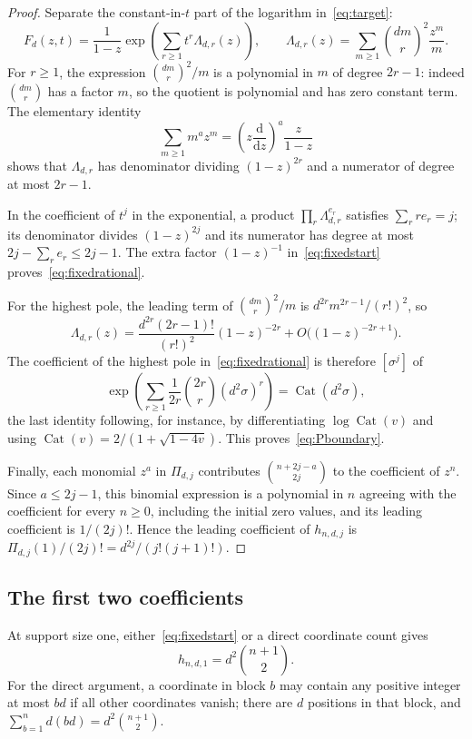 \documentclass[11pt]{article}
\numberwithin{equation}{section}
\theoremstyle{definition}
\newcommand{\Cat}{\operatorname{Cat}}
\begin{document}
\begin{proof}
Separate the constant-in-$t$ part of the logarithm in~\eqref{eq:target}:
\begin{equation}
 F_d(z,t)=\frac1{1-z}
   \exp\left(\sum_{r\geq1}t^r\Lambda_{d,r}(z)\right),
 \qquad
 \Lambda_{d,r}(z)=\sum_{m\geq1}\binom{dm}{r}^{\!2}\frac{z^m}{m}.
 \label{eq:fixedstart}
\end{equation}
For $r\geq1$, the expression $\binom{dm}{r}^2/m$ is a polynomial in $m$ of
degree $2r-1$: indeed $\binom{dm}{r}$ has a factor $m$, so the quotient is
polynomial and has zero constant term. The elementary identity
\[
 \sum_{m\geq1}m^az^m=\left(z\frac{\mathrm d}{\mathrm dz}\right)^a\frac{z}{1-z}
\]
shows that $\Lambda_{d,r}$ has denominator dividing $(1-z)^{2r}$ and a
numerator of degree at most $2r-1$.

In the coefficient of $t^j$ in the exponential, a product
$\prod_r\Lambda_{d,r}^{e_r}$ satisfies $\sum_r re_r=j$; its denominator
divides $(1-z)^{2j}$ and its numerator has degree at most
$2j-\sum_re_r\leq2j-1$. The extra factor $(1-z)^{-1}$
in~\eqref{eq:fixedstart} proves~\eqref{eq:fixedrational}.

For the highest pole, the leading term of $\binom{dm}{r}^2/m$ is
$d^{2r}m^{2r-1}/(r!)^2$, so
\begin{equation}
 \Lambda_{d,r}(z)=\frac{d^{2r}(2r-1)!}{(r!)^2}(1-z)^{-2r}
   +O\bigl((1-z)^{-2r+1}\bigr).
 \label{eq:Aleading}
\end{equation}
The coefficient of the highest pole in~\eqref{eq:fixedrational} is therefore
$[\sigma^j]$ of
\[
 \exp\left(\sum_{r\geq1}\frac1{2r}\binom{2r}{r}(d^2\sigma)^r\right)
 =\Cat(d^2\sigma),
\]
the last identity following, for instance, by differentiating $\log\Cat(v)$
and using $\Cat(v)=2/(1+\sqrt{1-4v})$. This proves~\eqref{eq:Pboundary}.

Finally, each monomial $z^a$ in $\Pi_{d,j}$ contributes
$\binom{n+2j-a}{2j}$ to the coefficient of $z^n$. Since $a\leq2j-1$, this
binomial expression is a polynomial in $n$ agreeing with the coefficient for
every $n\geq0$, including the initial zero values, and its leading
coefficient is $1/(2j)!$. Hence the leading coefficient of $h_{n,d,j}$ is
$\Pi_{d,j}(1)/(2j)!=d^{2j}/(j!(j+1)!)$.
\end{proof}

\subsection{The first two coefficients}
At support size one, either~\eqref{eq:fixedstart} or a direct coordinate count
gives
\begin{equation}
 h_{n,d,1}=d^2\binom{n+1}{2}.
 \label{eq:h1}
\end{equation}
For the direct argument, a coordinate in block $b$ may contain any positive
integer at most $bd$ if all other coordinates vanish; there are $d$ positions
in that block, and $\sum_{b=1}^nd(bd)=d^2\binom{n+1}{2}$.
\end{document}
